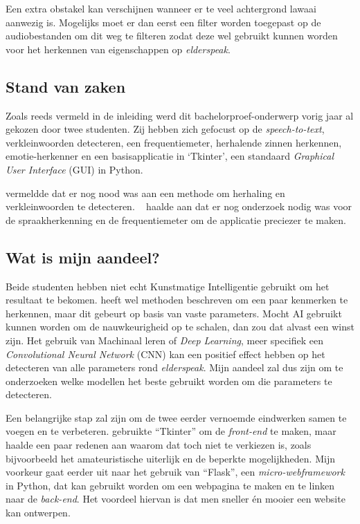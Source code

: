 Een extra obstakel kan verschijnen wanneer er te veel achtergrond lawaai aanwezig is. Mogelijks moet er dan eerst een filter worden toegepast op de audiobestanden om dit weg te filteren zodat deze wel gebruikt kunnen worden voor het herkennen van eigenschappen op \textit{elderspeak}.

\subsection{Stand van zaken}\label{subsec:stand-van-zaken}

Zoals reeds vermeld in de inleiding werd dit bachelorproef-onderwerp vorig jaar al gekozen door twee studenten.
Zij hebben zich gefocust op de \textit{speech-to-text}, verkleinwoorden detecteren, een frequentiemeter, herhalende zinnen herkennen, emotie-herkenner en een basisapplicatie in `Tkinter', een standaard \textit{Graphical User Interface} (GUI) in Python.

\textcite{Beeckman2021} vermeldde dat er nog nood was aan een methode om herhaling en verkleinwoorden te detecteren. ~\textcite{Standaert2021} haalde aan dat er nog onderzoek nodig was voor de spraakherkenning en de frequentiemeter om de applicatie preciezer te maken.

\subsection{Wat is mijn aandeel?}\label{subsec:watismijnadeel}

Beide studenten hebben niet echt Kunstmatige Intelligentie gebruikt om het resultaat te bekomen. \textcite{Standaert2021} heeft wel methoden beschreven om een paar kenmerken te herkennen, maar dit gebeurt op basis van vaste parameters.
Mocht AI gebruikt kunnen worden om de nauwkeurigheid op te schalen, dan zou dat alvast een winst zijn.
Het gebruik van Machinaal leren of \textit{Deep Learning}, meer specifiek een \textit{Convolutional Neural Network} (CNN) kan een positief effect hebben op het detecteren van alle parameters rond \textit{elderspeak}. Mijn aandeel zal dus zijn om te onderzoeken welke modellen het beste gebruikt worden om die parameters te detecteren.

Een belangrijke stap zal zijn om de twee eerder vernoemde eindwerken samen te voegen en te verbeteren. \textcite{Beeckman2021} gebruikte ``Tkinter'' om de \textit{front-end} te maken, maar haalde een paar redenen aan waarom dat toch niet te verkiezen is, zoals bijvoorbeeld het amateuristische uiterlijk en de beperkte mogelijkheden.
Mijn voorkeur gaat eerder uit naar het gebruik van ``Flask'', een \textit{micro-webframework} in Python, dat kan gebruikt worden om een webpagina te maken en te linken naar de \textit{back-end}.
Het voordeel hiervan is dat men sneller én mooier een website kan ontwerpen.


